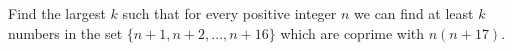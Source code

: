Find the largest $k$ such that for every positive integer $n$ we can find at least $k$ numbers in the set $\{n+1, n+2, ... , n+16\}$ which are coprime with $n(n+17)$.